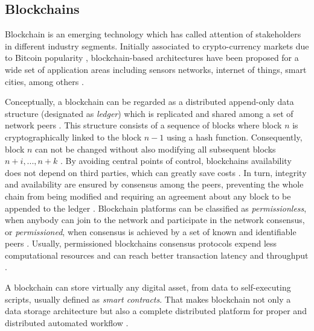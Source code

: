 \documentclass[sigplan]{acmart}
\begin{document}
\subsection{Blockchains}
Blockchain is an emerging technology which has called attention of stakeholders in different industry segments. 
Initially associated to crypto-currency markets due to Bitcoin popularity \cite{Zheng2017}, blockchain-based architectures have been proposed for a wide set of application areas including sensors networks, internet of things, smart cities, among others \cite{Zheng2017,Androulaki2018}.

Conceptually, a blockchain can be regarded as a distributed append-only data structure (designated as \emph{ledger}) which is replicated and shared among a set of network peers \cite{Christidis2016}. 
This structure consists of a sequence of blocks where block $n$ is cryptographically linked to the block $n-1$ using a hash function. 
Consequently, block $n$ can not be changed without also modifying all subsequent blocks $n + i, ..., n + k$ \cite{Sousa2017}. 
By avoiding central points of control, blockchains availability does not depend on third parties, which can greatly save costs \cite{Zheng2017}.
In turn, integrity and availability are ensured by consensus among the peers, preventing the whole chain from being modified and requiring an agreement about any block to be appended to the ledger \cite{Sousa2017,Vukolic2016}. 
Blockchain platforms can be classified as \emph{permissionless}, when anybody can join to the network and participate in the network consensus, or \emph{permissioned}, when consensus is achieved by a set of known and identifiable peers \cite{Vukolic2016,Androulaki2018}. 
Usually, permissioned blockchains consensus protocols expend less computational resources and can reach better transaction latency and throughput \cite{Sousa2017}.

A blockchain can store virtually any digital asset, from data to self-executing scripts, usually defined as \emph{smart contracts}. 
That makes blockchain not only a data storage architecture but also a complete distributed platform for proper and distributed automated workflow \cite{Christidis2016}. 
\end{document}

